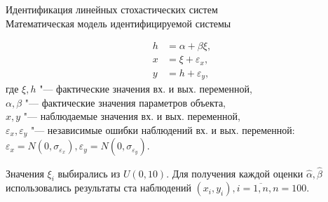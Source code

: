 \documentclass[hyperref={pdftex,unicode}]{beamer}
\begin{document}
\begin{frame}{%
    Идентификация линейных стохастических систем \\
    \small{Математическая модель идентифицируемой системы}
  }

  \begin{align*}
  h &= \alpha + \beta \xi, \\
  x &= \xi + \varepsilon_x, \\
  y &= h + \varepsilon_y,
  \end{align*}
  где \( \xi, h \)
  "--- фактические значения вх. и вых. переменной, \\
  \hspace*{4.5mm} \( \alpha, \beta \)
  "--- фактические значения параметров объекта, \\
  \hspace*{5.5mm} \( x, y \)
  "--- наблюдаемые значения вх. и вых. переменной, \\
  \hspace*{2.5mm} \( \varepsilon_x, \varepsilon_y \)
  "--- независимые ошибки наблюдений вх. и вых. переменной:
\(
\varepsilon_x = N(0, \sigma_{\varepsilon_x}),
\varepsilon_y = N(0, \sigma_{\varepsilon_y})
\).

\bigskip
\scriptsize{%
  Значения \( \xi_i \) выбирались из \( U(0, 10) \).
  Для получения каждой оценки \( \hat{\alpha}, \hat{\beta} \) использовались результаты
  ста наблюдений \( ( x_i, y_i ), i = \overline{1, n}, n = 100 \).
}
\end{frame}
\end{document}
